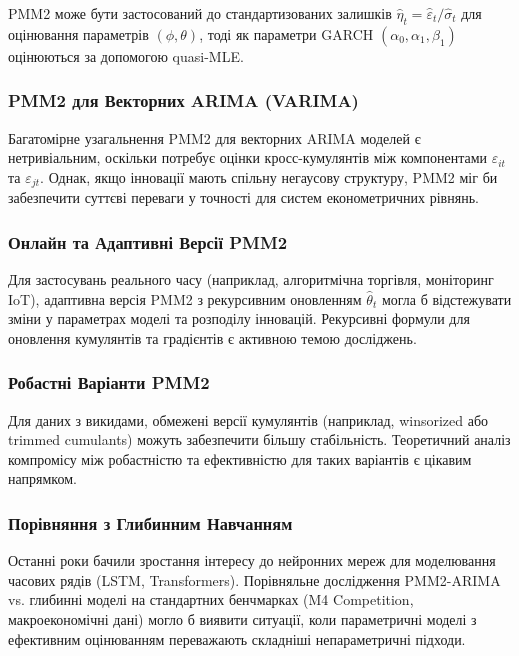 \documentclass[12pt,a4paper]{article}
\begin{document}
PMM2 може бути застосований до стандартизованих залишків $\hat{\eta}_t = \hat{\varepsilon}_t / \hat{\sigma}_t$ для оцінювання параметрів $(\phi, \theta)$, тоді як параметри GARCH $(\alpha_0, \alpha_1, \beta_1)$ оцінюються за допомогою quasi-MLE.

\subsubsection{PMM2 для Векторних ARIMA (VARIMA)}

Багатомірне узагальнення PMM2 для векторних ARIMA моделей є нетривіальним, оскільки потребує оцінки кросс-кумулянтів між компонентами $\varepsilon_{it}$ та $\varepsilon_{jt}$. Однак, якщо інновації мають спільну негаусову структуру, PMM2 міг би забезпечити суттєві переваги у точності для систем економетричних рівнянь.

\subsubsection{Онлайн та Адаптивні Версії PMM2}

Для застосувань реального часу (наприклад, алгоритмічна торгівля, моніторинг IoT), адаптивна версія PMM2 з рекурсивним оновленням $\hat{\theta}_t$ могла б відстежувати зміни у параметрах моделі та розподілу інновацій. Рекурсивні формули для оновлення кумулянтів та градієнтів є активною темою досліджень.

\subsubsection{Робастні Варіанти PMM2}

Для даних з викидами, обмежені версії кумулянтів (наприклад, winsorized або trimmed cumulants) можуть забезпечити більшу стабільність. Теоретичний аналіз компромісу між робастністю та ефективністю для таких варіантів є цікавим напрямком.

\subsubsection{Порівняння з Глибинним Навчанням}

Останні роки бачили зростання інтересу до нейронних мереж для моделювання часових рядів (LSTM, Transformers). Порівняльне дослідження PMM2-ARIMA vs. глибинні моделі на стандартних бенчмарках (M4 Competition, макроекономічні дані) могло б виявити ситуації, коли параметричні моделі з ефективним оцінюванням переважають складніші непараметричні підходи.
\end{document}
